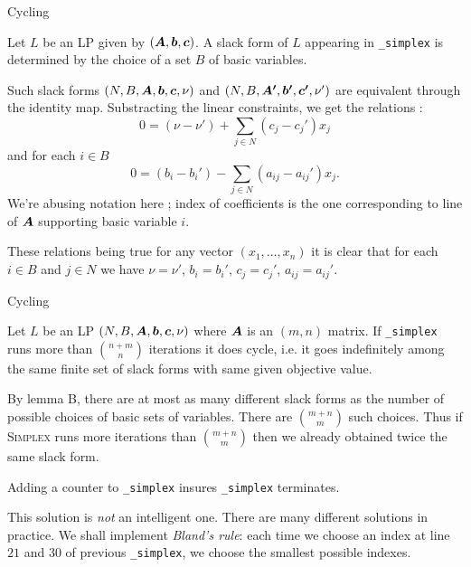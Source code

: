 \documentclass[aspectratio = 169]{beamer}
\begin{document}
    \begin{frame}{Cycling}
        \begin{lem}[$\bs{B}$]
          Let $L$ be an LP given by $(\boldsymbol{A}, \boldsymbol{b}, \boldsymbol{c})$. A
          slack form of $L$ appearing in \texttt{_simplex}
          is determined by the choice of a set $B$ of basic variables.
        \end{lem}
        \pause
        \setlength\columnseprule{.1pt}
        \begin{multicols}{2}
            \begin{demo}
              Such slack forms $(N, B, \boldsymbol{A}, \boldsymbol{b}, \boldsymbol{c}, \nu)$
              and $(N, B, \boldsymbol{A'}, \boldsymbol{b'}, \boldsymbol{c'}, \nu')$ are
              equivalent through the identity map.  \pause
              Substracting the linear constraints, we get the
              relations :
              \[
              0 = (\nu - \nu') + \sum_{j \in N} (c_j - c_j')x_j
              \]
              and for each $i \in B$
              \[
              0 = (b_i - b_i') - \sum_{j \in N} (a_{ij} - a_{ij}')x_j.
              \]
              We're abusing notation here ; index of coefficients is
              the one corresponding to line of $\boldsymbol{A}$ supporting
              basic variable $i$.

              \pause These relations being true for any vector
              $(x_1, \ldots, x_n)$ it is clear that for each $i \in B$
              and $j \in N$ we have  $\nu = \nu'$, $b_i = b_i'$, $c_j = c_j'$,
              $a_{ij} = a_{ij}'$.
            \end{demo}
        \end{multicols}
    \end{frame}

\begin{frame}{Cycling}
  \begin{prop}[\textbf{C}]
    Let $L$ be an LP $(N, B, \boldsymbol{A}, \boldsymbol{b}, \boldsymbol{c}, \nu)$ where
    $\boldsymbol{A}$ is an $(m, n)$ matrix. If \texttt{_simplex}
    runs more than $\binom{n+m}{n}$ iterations it does cycle, i.e. it
    goes indefinitely among the same finite set of slack forms with
    same given objective value.
  \end{prop}
  \begin{demo}
    By lemma B, there are at most as many different slack forms
    as the number of possible choices of basic sets of
    variables. There are $\binom{m+n}{m}$ such choices. Thus if
    \textsc{Simplex} runs more iterations than $\binom{m+n}{m}$
    then we already obtained twice the same slack form.
  \end{demo}
  \pause
  Adding a counter to \texttt{_simplex} insures
  \texttt{_simplex} terminates.

  \pause
  \begin{rem}
    This solution is \alert{\emph{not}} an intelligent one. There are
    many different solutions in practice.  We shall implement
    \emph{Bland's rule}: each time we choose an index at line $21$ and
    $30$ of previous \texttt{_simplex}, we choose the
    smallest possible indexes.
  \end{rem}
\end{frame}
\end{document}

